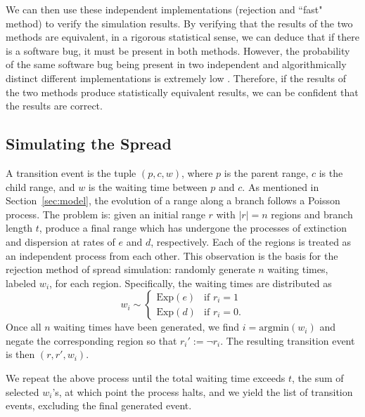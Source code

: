 \documentclass[a4paper]{article}
\newcommand{\rneg}[1]{\neg #1}
\begin{document}
We can then use these independent implementations (rejection and ``fast" method) to verify the simulation results.
By verifying that the results of the two methods are equivalent, in a rigorous statistical sense, we can
deduce that if there is a software bug, it must be present in both methods.
However, the probability of the same software bug being present in two independent and algorithmically distinct different
implementations is extremely low \cite{sklaroff1976, taneja2010}.
Therefore, if the results of the two methods produce statistically equivalent results, we can be confident that the
results are correct.


\subsection{Simulating the Spread}

A transition event is the tuple $(p, c, w)$, where $p$ is the parent range, $c$ is the child range, and $w$ is the
waiting time between $p$ and $c$.
As mentioned in Section~\ref{sec:model}, the evolution of a range along a branch follows a Poisson process.
The problem is: given an initial range \( r \) with \( |r| = n \) regions and branch length \( t \), produce a final range which
has undergone the processes of extinction and dispersion at rates of \( e \) and \( d \), respectively.
Each of the regions is treated as an independent process from each other.
This observation is the basis for the rejection method of spread simulation: randomly generate \( n \) waiting times,
labeled \( w_i \), for each region.
Specifically, the waiting times are distributed as
\begin{equation}
	\label{eq:exp-rejection} w_i \sim
	\begin{cases}
		\text{Exp}(e) & \text{if } r_i = 1 \\
    \text{Exp}(d) & \text{if } r_i = 0.
	\end{cases}
\end{equation}
Once all $n$ waiting times have been generated, we find $ i = \text{argmin}(w_i)$ and negate the corresponding
region so that $r_i' := \rneg{r_i}$.
The resulting transition event is then $(r, r', w_i)$.

We repeat the above process until the total waiting time exceeds $t$, the sum of selected $w_i$'s, at which point the
process halts, and we yield the list of transition events, excluding the final generated event.
\end{document}

